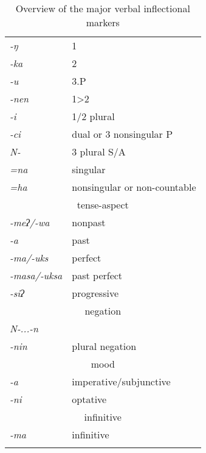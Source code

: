 \begin{table}[p]
\begin{centering}
\begin{tabular}{ll}
\lsptoprule
\multicolumn{2}{c}{ {\sc person-number}}\\
\midrule
\emph{-ŋ}&1\\
\emph{-ka}&2\\
\emph{-u}&3.P\\
\emph{-nen}&1>2\\
\emph{-i}&1/2 plural\\
\emph{-ci}&dual  or 3 nonsingular P \\
\emph{N-}&3 plural S/A\\
\emph{=na}&singular\\
\emph{=ha}&nonsingular or non-countable\\
\midrule
\multicolumn{2}{c}{ {\sc tense-aspect}}\\
\midrule
\emph{-meʔ/-wa}&nonpast\\
\emph{-a}&past\\
\emph{-ma/-uks}&perfect\\
\emph{-masa/-uksa}&past perfect\\
\emph{-siʔ}&progressive\\
\midrule
\multicolumn{2}{c}{ {\sc negation}}\\
\midrule
\emph{N-...-n}&\\
\emph{-nin}&plural negation\\
\midrule
\multicolumn{2}{c}{ {\sc mood}}\\
\midrule
\emph{-a}&imperative/subjunctive\\
\emph{-ni}&optative\\
\midrule
\multicolumn{2}{c}{ {\sc infinitive}}\\
\midrule
\emph{-ma}&infinitive\\
\lspbottomrule
\end{tabular}\\
\caption{Overview of the major verbal inflectional markers}\label{abc}
\end{centering}
\end{table} 

\pagestyle{empty}

